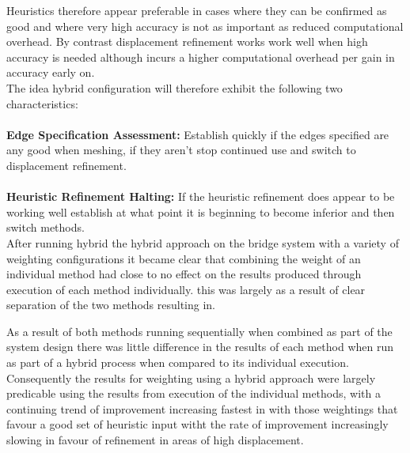 \noindent
Heuristics therefore appear preferable in cases where they can be confirmed as good and where very high accuracy is not as important as reduced computational overhead. By contrast displacement refinement works work well when high accuracy is needed although incurs a higher computational overhead per gain in accuracy early on. \\ 

\noindent
The idea hybrid configuration will therefore exhibit the following two characteristics:\\ \\ 
\noindent
\textbf{Edge Specification Assessment:} Establish quickly if the edges specified are any good when meshing, if they aren't stop continued use and switch to displacement refinement. \\ \\ 
\noindent
\textbf{Heuristic Refinement Halting:} If the heuristic refinement does appear to be working well establish at what point it is beginning to become inferior and then switch methods. \\

After running hybrid the hybrid approach on the bridge system with a variety of weighting configurations it became clear that combining the weight of an individual method had close to no effect on the results produced through execution of each method individually. this was largely as a result of clear separation of the two methods resulting in.

                                                                                                                                                       As a result of both methods running sequentially when combined as part of the system design there was little difference in the results of each method when run as part of a hybrid process when compared to its individual execution. Consequently the results for weighting using a hybrid approach were largely predicable using the results from execution of the individual methods, with a continuing trend of improvement increasing fastest in with those weightings that favour a good set of heuristic input witht the rate of improvement increasingly slowing in favour of refinement in areas of high displacement.
                                                                                                                                                       
                                                                                                                                                      

